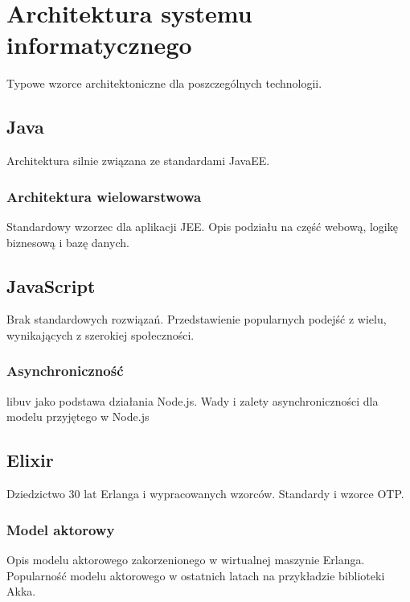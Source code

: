 \section{Architektura systemu
informatycznego}\label{architektura-systemu-informatycznego}

Typowe wzorce architektoniczne dla poszczególnych technologii.

\subsection{Java}\label{java-1}

Architektura silnie związana ze standardami JavaEE.

\subsubsection{Architektura
wielowarstwowa}\label{architektura-wielowarstwowa}

Standardowy wzorzec dla aplikacji JEE. Opis podziału na część webową,
logikę biznesową i bazę danych.

\subsection{JavaScript}\label{javascript-1}

Brak standardowych rozwiązań. Przedstawienie popularnych podejść z
wielu, wynikających z szerokiej społeczności.

\subsubsection{Asynchroniczność}\label{asynchronicznoux15bux107}

libuv jako podstawa działania Node.js. Wady i zalety asynchroniczności
dla modelu przyjętego w Node.js

\subsection{Elixir}\label{elixir-1}

Dziedzictwo 30 lat Erlanga i wypracowanych wzorców. Standardy i wzorce
OTP.

\subsubsection{Model aktorowy}\label{model-aktorowy}

Opis modelu aktorowego zakorzenionego w wirtualnej maszynie Erlanga.
Popularność modelu aktorowego w ostatnich latach na przykładzie
biblioteki Akka.

